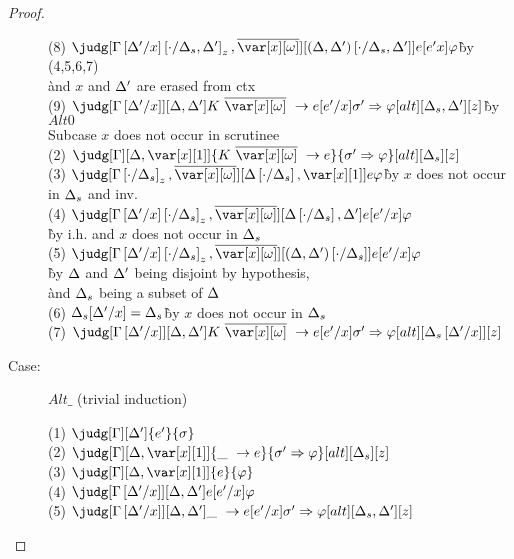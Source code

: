 \begin{proof}
\begin{description}
\begin{tabbing}
    (8) $\judg[\subst{\subst{\G}{\D'}{x}}{\cdot}{\D_s,\D'}_z,\ov{\xo}][\subst{(\D,\D')}{\cdot}{\D_s,\D'}]{e[e'x]}{\vp}$\` by (4,5,6,7)\\\` and $x$ and $\Delta'$ are erased from ctx\\
    (9) $\judg[\subst{\G}{\D'}{x}][\D,\D']{K~\ov{\xo}~\to e[e'/x]}{\s' \Rightarrow \vp}[alt][\D_s,\D'][z]$\` by $Alt0$\\
  Subcase $x$ does not occur in scrutinee\\
    (2) $\judg[\G][\D,\xl]{K~\ov{\xo}~\to e}{\s' \Rightarrow \vp}[alt][\D_s][z]$\\
    (3) $\judg[\subst{\G}{\cdot}{\D_s}_z,\ov{\xo}][\subst{\D}{\cdot}{\D_s},\xl]{e}{\vp}$\`by $x$ does not occur in $\Delta_s$ and inv.\\
    (4) $\judg[\subst{\subst{\G}{\D'}{x}}{\cdot}{\D_s}_z,\ov{\xo}][\subst{\D}{\cdot}{\D_s},\D']{e[e'/x]}{\vp}$\\\`by i.h. and $x$ does not occur in $\Delta_s$\\
    (5) $\judg[\subst{\subst{\G}{\D'}{x}}{\cdot}{\D_s}_z,\ov{\xo}][\subst{(\D,\D')}{\cdot}{\D_s}]{e[e'/x]}{\vp}$\\
    \`by $\Delta$ and $\Delta'$ being disjoint by hypothesis,\\
    \`and $\Delta_s$ being a subset of $\Delta$\\ %
    (6) $\Delta_s[\Delta'/x] = \Delta_s$\`by $x$ does not occur in $\Delta_s$\\
    (7) $\judg[\subst{\G}{\D'}{x}][\D,\D']{K~\ov{\xo}~\to e[e'/x]}{\s' \Rightarrow \vp}[alt][\subst{\D_s}{\D'}{x}][z]$\\
\end{tabbing}

\item[Case:] $Alt\_$ (trivial induction)
\begin{tabbing}
    (1) $\judg[\G][\D']{e'}{\s}$\\
    (2) $\judg[\G][\D,\xl]{\_~\to e}{\s' \Rightarrow \vp}[alt][\D_s][z]$\\
    (3) $\judg[\G][\D,\xl]{e}{\vp}$\\
    (4) $\judg[\subst{\G}{\D'}{x}][\D,\D']{e[e'/x]}{\vp}$\\
    (5) $\judg[\subst{\G}{\D'}{x}][\D,\D']{\_~\to e[e'/x]}{\s' \Rightarrow \vp}[alt][\D_s,\D'][z]$\\
\end{tabbing}

\end{description}

\end{proof}


